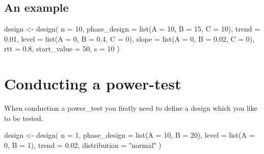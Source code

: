 \documentclass[
]{book}
\newenvironment{Shaded}{\begin{snugshade}}{\end{snugshade}}
\newcommand{\AttributeTok}[1]{\textcolor[rgb]{0.77,0.63,0.00}{#1}}
\newcommand{\DecValTok}[1]{\textcolor[rgb]{0.00,0.00,0.81}{#1}}
\newcommand{\FloatTok}[1]{\textcolor[rgb]{0.00,0.00,0.81}{#1}}
\newcommand{\FunctionTok}[1]{\textcolor[rgb]{0.00,0.00,0.00}{#1}}
\newcommand{\NormalTok}[1]{#1}
\newcommand{\OtherTok}[1]{\textcolor[rgb]{0.56,0.35,0.01}{#1}}
\newcommand{\StringTok}[1]{\textcolor[rgb]{0.31,0.60,0.02}{#1}}
\begin{document}
\hypertarget{an-example}{%
\subsection{An example}\label{an-example}}

\begin{Shaded}
\begin{Highlighting}[]
\NormalTok{design }\OtherTok{\textless{}{-}} \FunctionTok{design}\NormalTok{(}
  \AttributeTok{n =} \DecValTok{10}\NormalTok{, }
  \AttributeTok{phase\_design =} \FunctionTok{list}\NormalTok{(}\AttributeTok{A =} \DecValTok{10}\NormalTok{, }\AttributeTok{B =} \DecValTok{15}\NormalTok{, }\AttributeTok{C =} \DecValTok{10}\NormalTok{),}
  \AttributeTok{trend =} \FloatTok{0.01}\NormalTok{, }
  \AttributeTok{level =} \FunctionTok{list}\NormalTok{(}\AttributeTok{A =} \DecValTok{0}\NormalTok{, }\AttributeTok{B =} \FloatTok{0.4}\NormalTok{, }\AttributeTok{C =} \DecValTok{0}\NormalTok{), }
  \AttributeTok{slope =} \FunctionTok{list}\NormalTok{(}\AttributeTok{A =} \DecValTok{0}\NormalTok{, }\AttributeTok{B =} \FloatTok{0.02}\NormalTok{, }\AttributeTok{C =} \DecValTok{0}\NormalTok{),}
  \AttributeTok{rtt =} \FloatTok{0.8}\NormalTok{, }
  \AttributeTok{start\_value =} \DecValTok{50}\NormalTok{, }
  \AttributeTok{s =} \DecValTok{10}
\NormalTok{)}
\end{Highlighting}
\end{Shaded}

\hypertarget{conducting-a-power-test}{%
\section{Conducting a power-test}\label{conducting-a-power-test}}

When conduction a power\_test you firstly need to define a design which you like to be tested.

\begin{Shaded}
\begin{Highlighting}[]
\NormalTok{design }\OtherTok{\textless{}{-}} \FunctionTok{design}\NormalTok{(}
  \AttributeTok{n =} \DecValTok{1}\NormalTok{,}
  \AttributeTok{phase\_design =} \FunctionTok{list}\NormalTok{(}\AttributeTok{A =} \DecValTok{10}\NormalTok{, }\AttributeTok{B =} \DecValTok{20}\NormalTok{),}
  \AttributeTok{level =} \FunctionTok{list}\NormalTok{(}\AttributeTok{A =} \DecValTok{0}\NormalTok{, }\AttributeTok{B =} \DecValTok{1}\NormalTok{),}
  \AttributeTok{trend =} \FloatTok{0.02}\NormalTok{,}
  \AttributeTok{distribution =} \StringTok{"normal"}
\NormalTok{)}
\end{Highlighting}
\end{Shaded}
\end{document}
